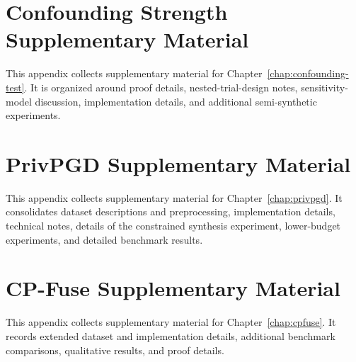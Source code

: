 \chapter{Confounding Strength Supplementary Material}
\label{chap:appendix-confounding-test}

This appendix collects supplementary material for Chapter~\ref{chap:confounding-test}. It is organized around proof details, nested-trial-design notes, sensitivity-model discussion, implementation details, and additional semi-synthetic experiments.



\insertchapterseparator
\chapter{PrivPGD Supplementary Material}
\label{chap:appendix-privpgd}

This appendix collects supplementary material for Chapter~\ref{chap:privpgd}. It consolidates dataset descriptions and preprocessing, implementation details, technical notes, details of the constrained synthesis experiment, lower-budget experiments, and detailed benchmark results.



\insertchapterseparator
\chapter{CP-Fuse Supplementary Material}
\label{chap:appendix-cpfuse}

This appendix collects supplementary material for Chapter~\ref{chap:cpfuse}. It records extended dataset and implementation details, additional benchmark comparisons, qualitative results, and proof details.


